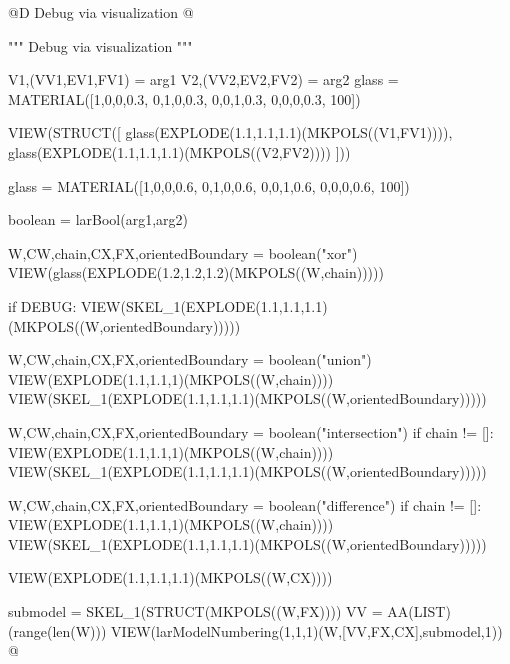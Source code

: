 \documentclass[11pt,oneside]{article}	%
\begin{document}
	
@D Debug via visualization
@{""" Debug via visualization """

V1,(VV1,EV1,FV1) = arg1
V2,(VV2,EV2,FV2) = arg2
glass = MATERIAL([1,0,0,0.3,  0,1,0,0.3,  0,0,1,0.3, 0,0,0,0.3, 100])

VIEW(STRUCT([
	glass(EXPLODE(1.1,1.1,1.1)(MKPOLS((V1,FV1)))),
	glass(EXPLODE(1.1,1.1,1.1)(MKPOLS((V2,FV2))))
]))

glass = MATERIAL([1,0,0,0.6,  0,1,0,0.6,  0,0,1,0.6, 0,0,0,0.6, 100])

boolean = larBool(arg1,arg2)	

W,CW,chain,CX,FX,orientedBoundary = boolean("xor")
VIEW(glass(EXPLODE(1.2,1.2,1.2)(MKPOLS((W,chain)))))

if DEBUG:
	VIEW(SKEL_1(EXPLODE(1.1,1.1,1.1)(MKPOLS((W,orientedBoundary)))))
	
	W,CW,chain,CX,FX,orientedBoundary = boolean("union")
	VIEW(EXPLODE(1.1,1.1,1)(MKPOLS((W,chain))))
	VIEW(SKEL_1(EXPLODE(1.1,1.1,1.1)(MKPOLS((W,orientedBoundary)))))
	
	W,CW,chain,CX,FX,orientedBoundary = boolean("intersection")
	if chain != []:
		VIEW(EXPLODE(1.1,1.1,1)(MKPOLS((W,chain))))
		VIEW(SKEL_1(EXPLODE(1.1,1.1,1.1)(MKPOLS((W,orientedBoundary)))))
	
	W,CW,chain,CX,FX,orientedBoundary = boolean("difference")
	if chain != []:
		VIEW(EXPLODE(1.1,1.1,1)(MKPOLS((W,chain))))
		VIEW(SKEL_1(EXPLODE(1.1,1.1,1.1)(MKPOLS((W,orientedBoundary)))))
	
		VIEW(EXPLODE(1.1,1.1,1.1)(MKPOLS((W,CX))))

submodel = SKEL_1(STRUCT(MKPOLS((W,FX))))
VV = AA(LIST)(range(len(W)))
VIEW(larModelNumbering(1,1,1)(W,[VV,FX,CX],submodel,1))
@}
\end{document}
